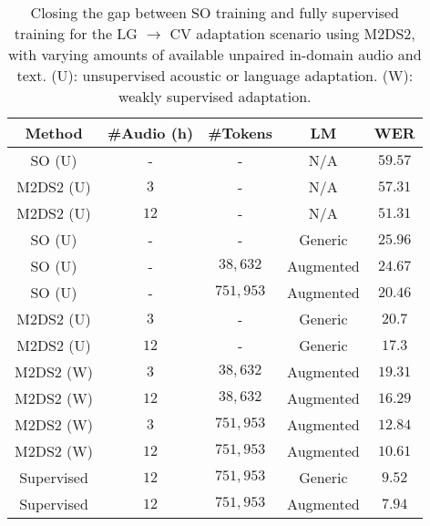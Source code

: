 \documentclass[journal]{IEEEtran}
\begin{document}
\begin{table}
    \centering
        \caption{\label{tab:closing-the-gap}Closing the gap between SO training and fully supervised training for the LG $\rightarrow$ CV adaptation scenario using M2DS2, with varying amounts of available unpaired in-domain audio and text. (U): unsupervised acoustic or language adaptation. (W): weakly supervised adaptation.}
    \begin{tabular}{c|cccc}
    \toprule
        Method & \#Audio (h) & \#Tokens &  LM  & WER \\
        \midrule
      SO (U) & - & - & N/A & $59.57$ \\
      M2DS2 (U) &   $3$	& - & N/A & $57.31$ \\
      M2DS2 (U) &   $12$	& - & N/A & $51.31$ \\
      \midrule
      SO (U) & - & - & Generic & $25.96$ \\
      SO (U) & - & $38,632$ & Augmented & $24.67$ \\
      SO (U) & - & $751,953$ & Augmented & $20.46$ \\
      M2DS2 (U) & $3$ & - & Generic & $20.7$ \\
      M2DS2 (U) & $12$ & - & Generic & $17.3$ \\
      \midrule
      M2DS2 (W) & $3$ & $38,632$ & Augmented & $19.31$ \\
      M2DS2 (W) & $12$ & $38,632$ & Augmented & $16.29$ \\
      M2DS2 (W) & $3$ & $751,953$ & Augmented & $12.84$ \\
      M2DS2 (W) & $12$ & $751,953$ & Augmented & $10.61$ \\
      \midrule
      Supervised & $12$ & $751,953$ & Generic & $9.52$ \\
      Supervised & $12$ & $751,953$ & Augmented & $7.94$ \\
        \bottomrule
    \end{tabular}

\end{table}
\end{document}
